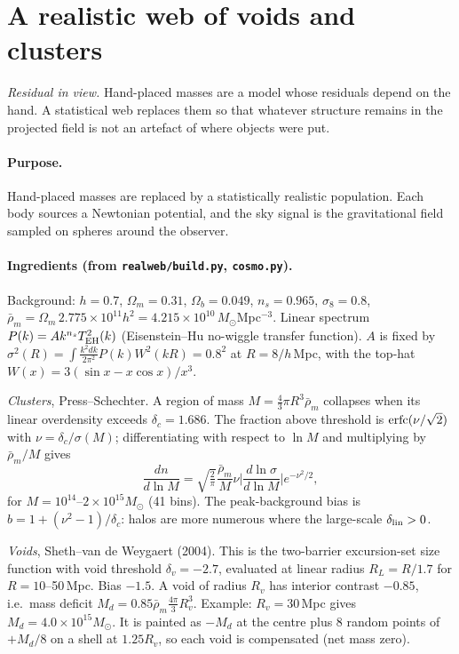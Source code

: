 \documentclass[10pt,twocolumn]{article}
\begin{document}
\section{A realistic web of voids and clusters}
\noindent\emph{Residual in view.} Hand-placed masses are a model whose residuals depend on the hand. A statistical web replaces them so that whatever structure remains in the projected field is not an artefact of where objects were put.

\paragraph{Purpose.} Hand-placed masses are replaced by a statistically realistic population. Each body sources a Newtonian potential, and the sky signal is the gravitational field sampled on spheres around the observer.

\paragraph{Ingredients (from \texttt{realweb/build.py}, \texttt{cosmo.py}).} Background: $h=0.7$, $\Omega_m=0.31$, $\Omega_b=0.049$, $n_s=0.965$, $\sigma_8=0.8$, $\bar\rho_m=\Omega_m\,2.775\times10^{11}h^2=4.215\times10^{10}\,M_\odot$Mpc$^{-3}$. Linear spectrum $P(k)=Ak^{n_s}T_{\rm EH}^2(k)$ (Eisenstein--Hu no-wiggle transfer function). $A$ is fixed by $\sigma^2(R)=\int\frac{k^2dk}{2\pi^2}P(k)W^2(kR)=0.8^2$ at $R=8/h$\,Mpc, with the top-hat $W(x)=3(\sin x-x\cos x)/x^3$.

\emph{Clusters}, Press--Schechter. A region of mass $M=\tfrac43\pi R^3\bar\rho_m$ collapses when its linear overdensity exceeds $\delta_c=1.686$. The fraction above threshold is ${\rm erfc}(\nu/\sqrt2)$ with $\nu=\delta_c/\sigma(M)$; differentiating with respect to $\ln M$ and multiplying by $\bar\rho_m/M$ gives
\begin{equation}
\frac{dn}{d\ln M}=\sqrt{\tfrac2\pi}\frac{\bar\rho_m}{M}\nu\Big|\frac{d\ln\sigma}{d\ln M}\Big|e^{-\nu^2/2},
\end{equation}
for $M=10^{14}$--$2\times10^{15}M_\odot$ (41 bins). The peak-background bias is $b=1+(\nu^2-1)/\delta_c$: halos are more numerous where the large-scale $\delta_{\rm lin}>0$.

\emph{Voids}, Sheth--van de Weygaert (2004). This is the two-barrier excursion-set size function with void threshold $\delta_v=-2.7$, evaluated at linear radius $R_L=R/1.7$ for $R=10$--50\,Mpc. Bias $-1.5$. A void of radius $R_v$ has interior contrast $-0.85$, i.e.\ mass deficit $M_d=0.85\bar\rho_m\tfrac{4\pi}{3}R_v^3$. Example: $R_v=30$\,Mpc gives $M_d=4.0\times10^{15}M_\odot$. It is painted as $-M_d$ at the centre plus 8 random points of $+M_d/8$ on a shell at $1.25R_v$, so each void is compensated (net mass zero).
\end{document}
